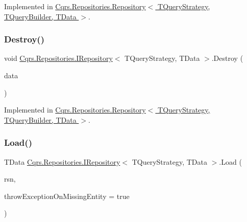 Implemented in \hyperlink{classCqrs_1_1Repositories_1_1Repository_a6b6b50d476a351fc7fbd194cb8fa44d0_a6b6b50d476a351fc7fbd194cb8fa44d0}{Cqrs.\+Repositories.\+Repository$<$ T\+Query\+Strategy, T\+Query\+Builder, T\+Data $>$}.

\mbox{\label{interfaceCqrs_1_1Repositories_1_1IRepository_a3a7a60be19498813b3822558b88fad66_a3a7a60be19498813b3822558b88fad66}} 
\subsubsection{\texorpdfstring{Destroy()}{Destroy()}}
{\footnotesize\ttfamily void \hyperlink{interfaceCqrs_1_1Repositories_1_1IRepository}{Cqrs.\+Repositories.\+I\+Repository}$<$ T\+Query\+Strategy, T\+Data $>$.Destroy (\begin{DoxyParamCaption}\item[{T\+Data}]{data }\end{DoxyParamCaption})}



Implemented in \hyperlink{classCqrs_1_1Repositories_1_1Repository_a6ed69cb5542164d9de81b0fa8a549d3e_a6ed69cb5542164d9de81b0fa8a549d3e}{Cqrs.\+Repositories.\+Repository$<$ T\+Query\+Strategy, T\+Query\+Builder, T\+Data $>$}.

\mbox{\label{interfaceCqrs_1_1Repositories_1_1IRepository_ae545451c48d1e2b5693db73e169e100d_ae545451c48d1e2b5693db73e169e100d}} 
\subsubsection{\texorpdfstring{Load()}{Load()}}
{\footnotesize\ttfamily T\+Data \hyperlink{interfaceCqrs_1_1Repositories_1_1IRepository}{Cqrs.\+Repositories.\+I\+Repository}$<$ T\+Query\+Strategy, T\+Data $>$.Load (\begin{DoxyParamCaption}\item[{Guid}]{rsn,  }\item[{bool}]{throw\+Exception\+On\+Missing\+Entity = {\ttfamily true} }\end{DoxyParamCaption})}



